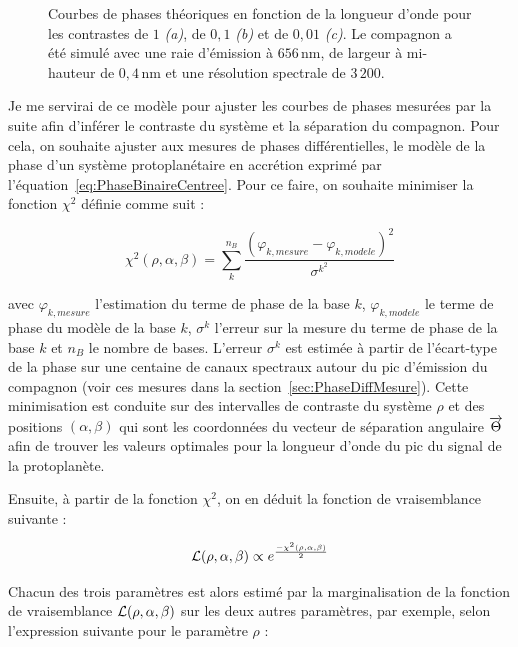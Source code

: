 \begin{figure}[ht!]
\begin{subfigure}{0.5\textwidth}
        \caption{}
        \label{fig:PhaseDiffWaveSimuleC}
    \end{subfigure}
    \caption[Courbes de phases théoriques en fonction de la longueur d'onde pour plusieurs contrastes.]{Courbes de phases théoriques en fonction de la longueur d'onde pour les contrastes de $1$ \textit{(a)}, de $0,1$ \textit{(b)} et de $0,01$ \textit{(c)}. Le compagnon a été simulé avec une raie d'émission à $656 \,$nm, de largeur à mi-hauteur de $0,4 \,$nm et une résolution spectrale de $3\,200$.}
    \label{fig:PhaseDiffWaveSimule}
\end{figure}

Je me servirai de ce modèle pour ajuster les courbes de phases mesurées par la suite afin d'inférer le contraste du système et la séparation du compagnon. Pour cela, on souhaite ajuster aux mesures de phases différentielles, le modèle de la phase d'un système protoplanétaire en accrétion exprimé par l'équation~\ref{eq:PhaseBinaireCentree}. Pour ce faire, on souhaite minimiser la fonction $\chi^2$ définie comme suit :

\begin{equation}
    \chi^2 (\rho, \alpha, \beta) = \sum_{k}^{n_B} \frac{(\varphi_{k, mesure} - \varphi_{k, modele})^2}{\sigma^{k^2}}
    \label{eq:chi2}
\end{equation}

\noindent avec $\varphi_{k, mesure}$ l'estimation du terme de phase de la base $k$, $\varphi_{k, modele}$ le terme de phase du modèle de la base $k$, $\sigma^{k}$ l'erreur sur la mesure du terme de phase de la base $k$ et $n_B$ le nombre de bases. L'erreur $\sigma^{k}$ est estimée à partir de l'écart-type de la phase sur une centaine de canaux spectraux autour du pic d'émission du compagnon (voir ces mesures dans la section~\ref{sec:PhaseDiffMesure}). Cette minimisation est conduite sur des intervalles de contraste du système $\rho$ et des positions $(\alpha, \beta)$ qui sont les coordonnées du vecteur de séparation angulaire $\overrightarrow{\Theta}$ afin de trouver les valeurs optimales pour la longueur d'onde du pic du signal de la protoplanète.

Ensuite, à partir de la fonction $\chi^2$, on en déduit la fonction de vraisemblance suivante :

\begin{equation}
    \mathcal{L} (\rho, \alpha, \beta) \propto e^{\frac{-\chi^2 (\rho, \alpha, \beta)}{2}}
\end{equation}

Chacun des trois paramètres est alors estimé par la marginalisation de la fonction de vraisemblance $\mathcal{L} (\rho, \alpha, \beta)$ sur les deux autres paramètres, par exemple, selon l'expression suivante pour le paramètre $\rho$ :

